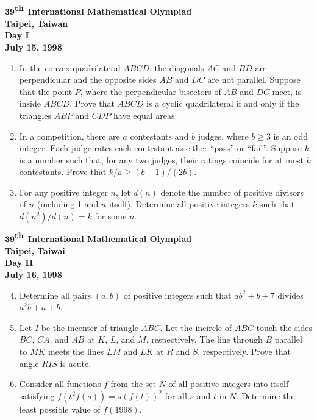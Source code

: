 \documentclass[12pt]{article}
\begin{document}
\begin{center}
${\bf 39}^{\mbox{\bf th}}$ {\bf International
Mathematical Olympiad} \\[.1in]
{\bf Taipei, Taiwan} \\ [.05in]
{\bf Day I}\\[.05in]
{\bf July 15, 1998}
\end{center}

\vspace*{.3in}

\begin{enumerate}
\item %
In the convex quadrilateral $ABCD$, the diagonals $AC$ and $BD$
are perpendicular and the opposite sides $AB$ and $DC$ are not parallel.
Suppose that the point $P$, where the perpendicular bisectors of $AB$ and $DC$
meet, is inside $ABCD$.  Prove that $ABCD$ is a cyclic quadrilateral if and
only if the triangles $ABP$ and $CDP$ have equal areas.

\item %
In a competition, there are $a$ contestants and $b$ judges, where $b
\geq 3$ is an odd integer. Each judge rates each contestant as either
``pass'' or ``fail''. Suppose $k$ is a number such that, for any two
judges, their ratings coincide for at most $k$ contestants. Prove that
$k/a \geq (b-1)/(2b)$.

\item %
For any positive integer $n$, let $d(n)$ denote the number of
positive divisors of $n$ (including 1 and $n$ itself).
Determine all positive integers $k$ such that $d(n^2)/d(n) = k$ for some $n$.

\end{enumerate}

\pagebreak %
\begin{center}
${\bf 39}^{\mbox{\bf th}}$ {\bf International
Mathematical Olympiad} \\[.1in]
{\bf Taipei, Taiwai} \\ [.05in]
{\bf Day II}\\[.05in]
{\bf July 16, 1998}
\end{center}

\vspace*{.3in}

\begin{enumerate}
\setcounter{enumi}{3}
\item %
Determine all pairs $(a, b)$ of positive integers such that $ab^2+b+7$
divides $a^2 b+a+b$.

\item %
Let $I$ be the incenter of triangle $ABC$.  Let the incircle of $ABC$
touch the sides $BC$, $CA$, and $AB$ at $K$, $L$, and $M$,
respectively.  The line through $B$ parallel to $MK$ meets the lines
$LM$ and $LK$ at $R$ and $S$, respectively.  Prove that angle $RIS$ is acute.

\item %
Consider all functions $f$ from the set $N$ of all positive
integers into itself satisfying $f(t^2 f(s)) = s(f(t))^2$ for all $s$
and $t$ in $N$.  Determine the least possible value of $f(1998)$.


\end{enumerate}
\end{document}
